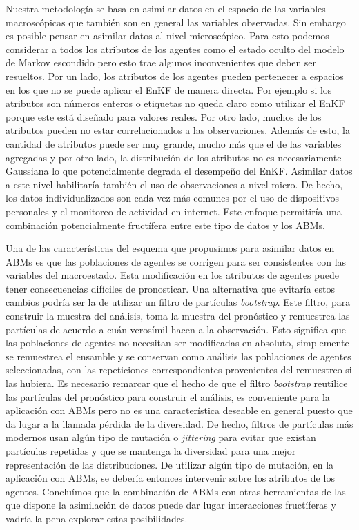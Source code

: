 Nuestra metodología se basa en asimilar datos en el espacio de las variables macroscópicas que también son en general las variables observadas. Sin embargo es posible pensar en asimilar datos al nivel microscópico. Para esto podemos considerar a todos los atributos de los agentes como el estado oculto del modelo de Markov escondido pero esto trae algunos inconvenientes que deben ser resueltos. Por un lado, los atributos de los agentes pueden pertenecer a espacios en los que no se puede aplicar el EnKF de manera directa. Por ejemplo si los atributos son números enteros o etiquetas no queda claro como utilizar el EnKF porque este está diseñado para valores reales. Por otro lado, muchos de los atributos pueden no estar correlacionados a las observaciones. Además de esto, la cantidad de atributos puede ser muy grande, mucho más que el de las variables agregadas y por otro lado, la distribución de los atributos no es necesariamente Gaussiana lo que potencialmente degrada el desempeño del EnKF. Asimilar datos a este nivel habilitaría también el uso de observaciones a nivel micro. De hecho, los datos individualizados son cada vez más comunes por el uso de dispositivos personales y el monitoreo de actividad en internet. Este enfoque permitiría una combinación potencialmente fructífera entre este tipo de datos y los ABMs. 

Una de las características del esquema que propusimos para asimilar datos en ABMs es que las poblaciones de agentes se corrigen para ser consistentes con las variables del macroestado. Esta modificación en los atributos de agentes puede tener consecuencias difíciles de pronosticar. Una alternativa que evitaría estos cambios podría ser la de utilizar un filtro de partículas \textit{bootstrap}. Este filtro, para construir la muestra del análisis, toma la muestra del pronóstico y remuestrea las partículas de acuerdo a cuán verosímil hacen a la observación. Esto significa que las poblaciones de agentes no necesitan ser modificadas en absoluto, simplemente se remuestrea el ensamble y se conservan como análisis las poblaciones de agentes seleccionadas, con las repeticiones correspondientes provenientes del remuestreo si las hubiera. Es necesario remarcar que el hecho de que el filtro \textit{bootstrap} reutilice las partículas del pronóstico para construir el análisis, es conveniente para la aplicación con ABMs pero no es una característica deseable en general puesto que da lugar a la llamada pérdida de la diversidad. De hecho, filtros de partículas más modernos usan algún tipo de mutación o \textit{jittering} para evitar que existan partículas repetidas y que se mantenga la diversidad para una mejor representación de las distribuciones. De utilizar algún tipo de mutación, en la aplicación con ABMs, se debería entonces intervenir sobre los atributos de los agentes. Concluímos que la combinación de ABMs con otras herramientas de las que dispone la asimilación de datos puede dar lugar interacciones fructíferas y vadría la pena explorar estas posibilidades.

